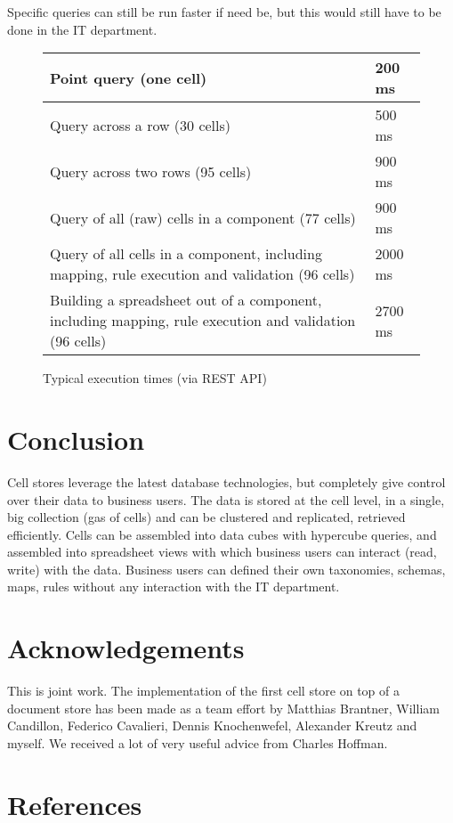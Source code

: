 \documentclass{vldb}
\begin{document}
Specific queries can still be run faster if need be, but this would still have to be done in the IT department.

\begin{figure*}
\caption{Typical execution times (via REST API)}
\label{fig-measurements}
\begin{tabular}{|l|l|}
\hline
Point query (one cell) & 200 ms \\
\hline
Query across a row (30 cells)& 500 ms \\
\hline
Query across two rows (95 cells)& 900 ms \\
\hline
Query of all (raw) cells in a component (77 cells) & 900 ms \\
\hline
Query of all cells in a component, including mapping, rule execution and validation (96 cells) & 2000 ms \\
\hline
Building a spreadsheet out of a component, including mapping, rule execution and validation (96 cells) & 2700 ms \\
\hline
\end{tabular}
\end{figure*}

\section{Conclusion}

Cell stores leverage the latest database technologies, but completely give control over their data to business users. The data is stored at the cell level, in a single, big collection (gas of cells) and can be clustered and replicated, retrieved efficiently. Cells can be assembled into data cubes with hypercube queries, and assembled into spreadsheet views with which business users can interact (read, write) with the data. Business users can defined their own taxonomies, schemas, maps, rules without any interaction with the IT department.

\section{Acknowledgements}

This is joint work. The implementation of the first cell store on top of a document store has been made as a team effort by Matthias Brantner, William Candillon, Federico Cavalieri, Dennis Knochenwefel, Alexander Kreutz and myself. We received a lot of very useful advice from Charles Hoffman.

\section{References}
\end{document}
